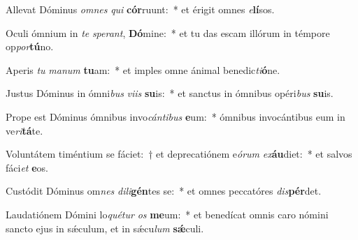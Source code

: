 \item Allevat Dóminus \textit{om}\textit{nes} \textit{qui} \textbf{cór}ruunt:~* et érigit omnes \textit{e}\textbf{lí}sos.
\item Oculi ómnium in \textit{te} \textit{spe}\textit{rant}, \textbf{Dó}mine:~* et tu das escam illórum in témpore op\textit{por}\textbf{tú}no.
\item Aperis \textit{tu} \textit{ma}\textit{num} \textbf{tu}am:~* et imples omne ánimal benedic\textit{ti}\textbf{ó}ne.
\item Justus Dóminus in ómni\textit{bus} \textit{vi}\textit{is} \textbf{su}is:~* et sanctus in ómnibus opéri\textit{bus} \textbf{su}is.
\item Prope est Dóminus ómnibus invo\textit{cán}\textit{ti}\textit{bus} \textbf{e}um:~* ómnibus invocántibus eum in ve\textit{ri}\textbf{tá}te.
\item Voluntátem timéntium se fáciet:~† et deprecatiónem e\textit{ó}\textit{rum} \textit{ex}\textbf{áu}diet:~* et salvos fáci\textit{et} \textbf{e}os.
\item Custódit Dóminus om\textit{nes} \textit{di}\textit{li}\textbf{gén}tes se:~* et omnes peccatóres \textit{dis}\textbf{pér}det.
\item Laudatiónem Dómini lo\textit{qué}\textit{tur} \textit{os} \textbf{me}um:~* et benedícat omnis caro nómini sancto ejus in sǽculum, et in sǽcu\textit{lum} \textbf{sǽ}culi.
